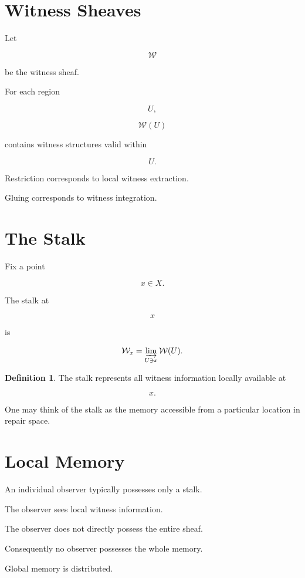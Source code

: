 \documentclass[12pt,oneside]{book}
\theoremstyle{plain} \newtheorem{theorem}{Theorem}[chapter] \newtheorem{lemma}[theorem]{Lemma} \newtheorem{proposition}[theorem]{Proposition} \newtheorem{corollary}[theorem]{Corollary}
\theoremstyle{definition} \newtheorem{definition}[theorem]{Definition} \newtheorem{axiom}[theorem]{Axiom} \newtheorem{construction}[theorem]{Construction}
\theoremstyle{remark} \newtheorem{remark}[theorem]{Remark} \newtheorem{example}[theorem]{Example}
\begin{document}
\section{Witness Sheaves}

Let

\[
\mathcal W
\]

be the witness sheaf.

For each region

\[
U,
\]

\[
\mathcal W(U)
\]

contains witness structures valid within

\[
U.
\]

Restriction corresponds to local witness extraction.

Gluing corresponds to witness integration.

\section{The Stalk}

Fix a point

\[
x
\in
X.
\]

The stalk at

\[
x
\]

is

\[
\mathcal W_x
=
\varinjlim_{U\ni x}
\mathcal W(U).
\]

\begin{definition}

The stalk represents all witness information locally available at

\[
x.
\]

\end{definition}

One may think of the stalk as the memory accessible from a particular location in repair space.

\section{Local Memory}

An individual observer typically possesses only a stalk.

The observer sees local witness information.

The observer does not directly possess the entire sheaf.

Consequently no observer possesses the whole memory.

Global memory is distributed.
\end{document}

